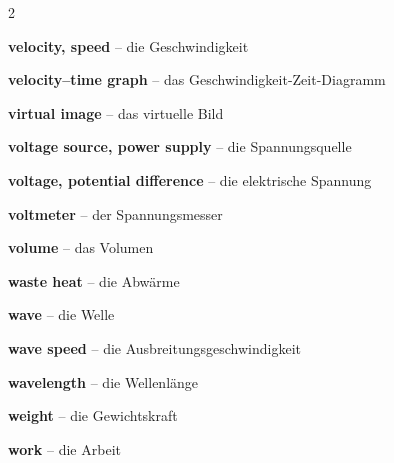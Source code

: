 \begin{multicols}{2}
\par\nopagebreak
\textbf{velocity, speed} -- die Geschwindigkeit\dotfill\hyperref[e:37]{\pageref*{e:37}}\par
\textbf{velocity–time graph} -- das Geschwindigkeit-Zeit-Diagramm\dotfill\hyperref[e:45]{\pageref*{e:45}}\par
\textbf{virtual image} -- das virtuelle Bild\dotfill\hyperref[e:251]{\pageref*{e:251}}\par
\textbf{voltage source, power supply} -- die Spannungsquelle\dotfill\hyperref[e:155]{\pageref*{e:155}}\par
\textbf{voltage, potential difference} -- die elektrische Spannung\dotfill\hyperref[e:145]{\pageref*{e:145}}\par
\textbf{voltmeter} -- der Spannungsmesser\dotfill\hyperref[e:161]{\pageref*{e:161}}\par
\textbf{volume} -- das Volumen\dotfill\hyperref[e:57]{\pageref*{e:57}}\par

\par\nopagebreak
\textbf{waste heat} -- die Abwärme\dotfill\hyperref[e:108]{\pageref*{e:108}}\par
\textbf{wave} -- die Welle\dotfill\hyperref[e:201]{\pageref*{e:201}}\par
\textbf{wave speed} -- die Ausbreitungsgeschwindigkeit\dotfill\hyperref[e:203]{\pageref*{e:203}}\par
\textbf{wavelength} -- die Wellenlänge\dotfill\hyperref[e:202]{\pageref*{e:202}}\par
\textbf{weight} -- die Gewichtskraft\dotfill\hyperref[e:63]{\pageref*{e:63}}\par
\textbf{work} -- die Arbeit\dotfill\hyperref[e:96]{\pageref*{e:96}}\par
\end{multicols}


